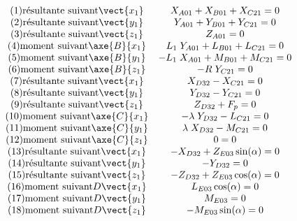 \begin{align*}
\begin{array}{c}
(1) \mbox{résultante suivant} \vect{x_1} \\ 
(2) \mbox{résultante suivant} \vect{y_1} \\ 
(3) \mbox{résultante suivant} \vect{z_1} \\ 
(4) \mbox{moment suivant} \axe{B}{{x_1}} \\ 
(5) \mbox{moment suivant} \axe{B}{{y_1}} \\ 
(6) \mbox{moment suivant} \axe{B}{{z_1}} \\ 
(7) \mbox{résultante suivant} \vect{x_1} \\ 
(8) \mbox{résultante suivant} \vect{y_1} \\ 
(9) \mbox{résultante suivant} \vect{z_1} \\ 
(10) \mbox{moment suivant} \axe{C}{{x_1}} \\ 
(11) \mbox{moment suivant} \axe{C}{{y_1}} \\ 
(12) \mbox{moment suivant} \axe{C}{{z_1}} \\ 
(13) \mbox{résultante suivant} \vect{x_1} \\ 
(14) \mbox{résultante suivant} \vect{y_1} \\ 
(15) \mbox{résultante suivant} \vect{z_1} \\ 
(16) \mbox{moment suivant} {D}{\vect{x_1}} \\ 
(17) \mbox{moment suivant} {D}{\vect{y_1}} \\ 
(18) \mbox{moment suivant} {D}{\vect{z_1}} \\ 
\end{array}
\begin{array}{c}
X_{A01}+X_{B01}+X_{C21}=0 \\
Y_{A01}+Y_{B01}+Y_{C21}=0 \\ 
Z_{A01}=0 \\ 
L_1\;Y_{A01}+L_{B01}+L_{C21}=0 \\ 
-L_1\;X_{A01}+M_{B01}+M_{C21}=0 \\  
-R\;Y_{C21} =0\\
X_{D32}-X_{C21}=0 \\ 
Y_{D32}-Y_{C21}=0 \\  
Z_{D32}+F_p=0 \\ 
-\lambda\;Y_{D32}-L_{C21}=0 \\ 
\lambda\;X_{D32}-M_{C21}=0 \\ 
0 =0\\
-X_{D32}+Z_{E03}\sin(\alpha)=0 \\ 
-Y_{D32}=0 \\ 
-Z_{D32}+Z_{E03}\cos(\alpha)=0 \\ 
L_{E03}\cos(\alpha)=0 \\ 
M_{E03}=0\\ 
-M_{E03}\sin(\alpha)=0\\ 
\end{array}%
\end{align*}


